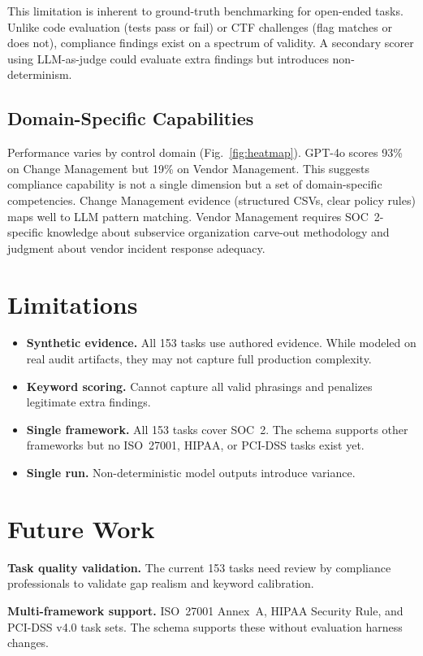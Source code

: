\documentclass[conference]{IEEEtran}
\begin{document}
This limitation is inherent to ground-truth benchmarking for open-ended tasks. Unlike code evaluation (tests pass or fail) or CTF challenges (flag matches or does not), compliance findings exist on a spectrum of validity. A secondary scorer using LLM-as-judge could evaluate extra findings but introduces non-determinism.

\subsection{Domain-Specific Capabilities}

Performance varies by control domain (Fig.~\ref{fig:heatmap}). GPT-4o scores 93\% on Change Management but 19\% on Vendor Management. This suggests compliance capability is not a single dimension but a set of domain-specific competencies. Change Management evidence (structured CSVs, clear policy rules) maps well to LLM pattern matching. Vendor Management requires SOC~2-specific knowledge about subservice organization carve-out methodology and judgment about vendor incident response adequacy.

\section{Limitations}

\begin{itemize}
\item \textbf{Synthetic evidence.} All 153 tasks use authored evidence. While modeled on real audit artifacts, they may not capture full production complexity.
\item \textbf{Keyword scoring.} Cannot capture all valid phrasings and penalizes legitimate extra findings.
\item \textbf{Single framework.} All 153 tasks cover SOC~2. The schema supports other frameworks but no ISO~27001, HIPAA, or PCI-DSS tasks exist yet.
\item \textbf{Single run.} Non-deterministic model outputs introduce variance.
\end{itemize}

\section{Future Work}

\textbf{Task quality validation.} The current 153 tasks need review by compliance professionals to validate gap realism and keyword calibration.

\textbf{Multi-framework support.} ISO~27001 Annex~A, HIPAA Security Rule, and PCI-DSS v4.0 task sets. The schema supports these without evaluation harness changes.
\end{document}
